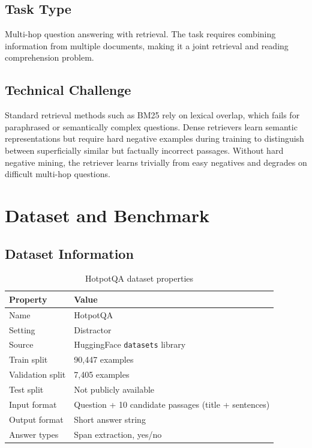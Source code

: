 \documentclass[12pt,a4paper]{article}
\begin{document}
\subsection*{Task Type}

Multi-hop question answering with retrieval. The task requires combining information
from multiple documents, making it a joint retrieval and reading comprehension problem.

\subsection*{Technical Challenge}

Standard retrieval methods such as BM25 rely on lexical overlap, which fails for
paraphrased or semantically complex questions. Dense retrievers learn semantic
representations but require hard negative examples during training to distinguish
between superficially similar but factually incorrect passages. Without hard negative
mining, the retriever learns trivially from easy negatives and degrades on difficult
multi-hop questions.

\section{Dataset and Benchmark}

\subsection*{Dataset Information}

\begin{table}[h]
\centering
\begin{tabular}{ll}
\toprule
\textbf{Property} & \textbf{Value} \\
\midrule
Name              & HotpotQA \\
Setting           & Distractor \\
Source            & HuggingFace \texttt{datasets} library \\
Train split       & 90,447 examples \\
Validation split  & 7,405 examples \\
Test split        & Not publicly available \\
Input format      & Question + 10 candidate passages (title + sentences) \\
Output format     & Short answer string \\
Answer types      & Span extraction, yes/no \\
\bottomrule
\end{tabular}
\caption{HotpotQA dataset properties}
\end{table}
\end{document}
